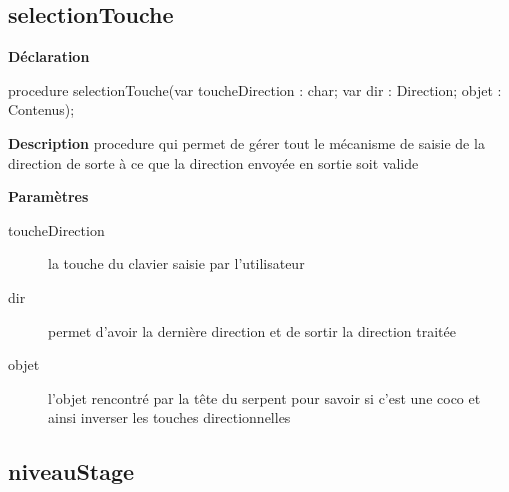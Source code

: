 \documentclass{report}
\newif\ifpdf
\begin{document}
\subsection*{selectionTouche}
\fi
\label{Jouer-selectionTouche}
\begin{list}{}{
\setlength{\itemindent}{0cm}
\setlength{\listparindent}{0cm}
\setlength{\leftmargin}{\evensidemargin}
\addtolength{\leftmargin}{\tmplength}
\settowidth{\labelsep}{X}
\addtolength{\leftmargin}{\labelsep}
\setlength{\labelwidth}{\tmplength}
}
\item[\textbf{Déclaration}\hfill]
\ifpdf
\begin{flushleft}
\fi
\begin{ttfamily}
procedure selectionTouche(var toucheDirection : char; var dir : Direction; objet : Contenus);\end{ttfamily}

\ifpdf
\end{flushleft}
\fi

\par
\item[\textbf{Description}]
procedure qui permet de gérer tout le mécanisme de saisie de la direction de sorte à ce que la direction envoyée en sortie soit valide   \par
\item[\textbf{Paramètres}]
\begin{description}
\item[toucheDirection] la touche du clavier saisie par l'utilisateur
\item[dir] permet d'avoir la dernière direction et de sortir la direction traitée
\item[objet] l'objet rencontré par la tête du serpent pour savoir si c'est une coco et ainsi inverser les touches directionnelles
\end{description}


\end{list}
\ifpdf
\subsection*{\large{\textbf{niveauStage}}\normalsize\hspace{1ex}\hrulefill}
\else
\end{document}

